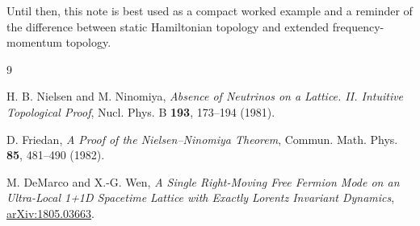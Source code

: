 \documentclass[11pt]{article}
\begin{document}
Until then, this note is best used as a compact worked example and a reminder of the difference between static Hamiltonian topology and extended frequency-momentum topology.

\begin{thebibliography}{9}

H. B. Nielsen and M. Ninomiya,
\emph{Absence of Neutrinos on a Lattice. II. Intuitive Topological Proof},
Nucl. Phys. B \textbf{193}, 173--194 (1981).

D. Friedan,
\emph{A Proof of the Nielsen--Ninomiya Theorem},
Commun. Math. Phys. \textbf{85}, 481--490 (1982).

M. DeMarco and X.-G. Wen,
\emph{A Single Right-Moving Free Fermion Mode on an Ultra-Local 1+1D Spacetime Lattice with Exactly Lorentz Invariant Dynamics},
\href{https://arxiv.org/abs/1805.03663}{arXiv:1805.03663}.

\end{thebibliography}
\end{document}
